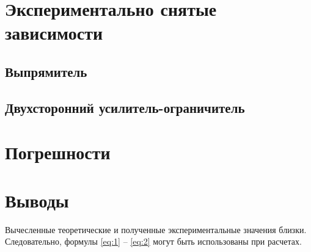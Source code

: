 \section{Экспериментально снятые зависимости}

\subsection{Выпрямитель}

\subsection{Двухсторонний усилитель-ограничитель}

\section{Погрешности}

\section{Выводы}

Вычесленные теоретические и полученные экспериментальные значения близки. Следовательно, формулы \ref{eq:1} -- \ref{eq:2} могут быть использованы при расчетах.


